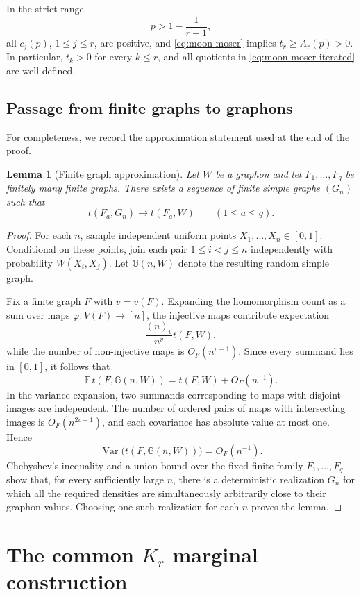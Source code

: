 \documentclass[11pt]{article}
\newtheorem{lemma}[lemma]{Lemma}
\numberwithin{equation}{section}
\newcommand{\bbE}{\mathbb E}
\begin{document}
In the strict range
\[
 p>1-\frac{1}{r-1},\label{eq:strict-range}
\]
all $c_j(p)$, $1\leq j\leq r$, are positive, and
\eqref{eq:moon-moser} implies $t_r\geq A_r(p)>0$.  In particular,
$t_k>0$ for every $k\leq r$, and all quotients in
\eqref{eq:moon-moser-iterated} are well defined.

\subsection{Passage from finite graphs to graphons}

For completeness, we record the approximation statement used at the end
of the proof.

\begin{lemma}[Finite graph approximation]\label{lem:finite-approximation}
Let $W$ be a graphon and let $F_1,\dots,F_q$ be finitely many finite
graphs.  There exists a sequence of finite simple graphs $(G_n)$ such
that
\[
 t(F_a,G_n)\longrightarrow t(F_a,W)
 \qquad
 (1\leq a\leq q).
\]
\end{lemma}

\begin{proof}
For each $n$, sample independent uniform points
$X_1,\dots,X_n\in[0,1]$.  Conditional on these points, join each pair
$1\leq i<j\leq n$ independently with probability $W(X_i,X_j)$.  Let
$\mathbb G(n,W)$ denote the resulting random simple graph.

Fix a finite graph $F$ with $v=v(F)$.  Expanding the homomorphism count as
a sum over maps $\varphi:V(F)\to[n]$, the injective maps contribute
expectation
\[
 \frac{(n)_v}{n^v}t(F,W),
\]
while the number of non-injective maps is $O_F(n^{v-1})$.  Since every
summand lies in $[0,1]$, it follows that
\[
 \bbE\,t(F,\mathbb G(n,W))
 =t(F,W)+O_F(n^{-1}).
\]
In the variance expansion, two summands corresponding to maps with
disjoint images are independent.  The number of ordered pairs of maps
with intersecting images is $O_F(n^{2v-1})$, and each covariance has
absolute value at most one.  Hence
\[
 \operatorname{Var}\bigl(t(F,\mathbb G(n,W))\bigr)
 =O_F(n^{-1}).
\]
Chebyshev's inequality and a union bound over the fixed finite family
$F_1,\dots,F_q$ show that, for every sufficiently large $n$, there is a
deterministic realization $G_n$ for which all the required densities are
simultaneously arbitrarily close to their graphon values.  Choosing one
such realization for each $n$ proves the lemma.
\end{proof}

\section{The common \texorpdfstring{$K_r$}{Kr} marginal construction}\label{sec:common-law}
\end{document}
